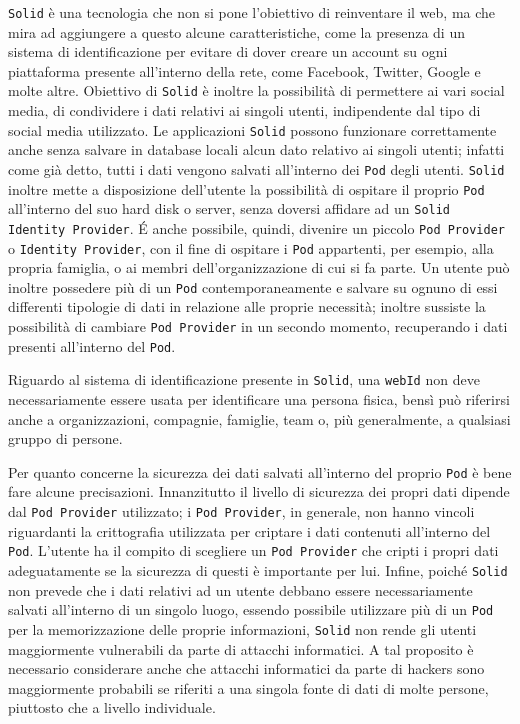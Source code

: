 {\tt Solid} è una tecnologia che non si pone l'obiettivo di reinventare il web, ma che mira ad aggiungere a questo alcune caratteristiche, come la presenza di un sistema di identificazione per evitare di dover creare un account su ogni piattaforma presente all'interno della rete, come Facebook, Twitter, Google e molte altre. Obiettivo di {\tt Solid} è inoltre la possibilità di permettere ai vari social media, di condividere i dati relativi ai singoli utenti, indipendente dal tipo di social media utilizzato. Le applicazioni {\tt Solid} possono funzionare correttamente anche senza salvare in database locali alcun dato relativo ai singoli utenti; infatti come già detto, tutti i dati vengono salvati all'interno dei {\tt Pod} degli utenti. {\tt Solid} inoltre mette a disposizione dell'utente la possibilità di ospitare il proprio {\tt Pod} all'interno del suo hard disk o server, senza doversi affidare ad un {\tt Solid Identity Provider}. É anche possibile, quindi, divenire un piccolo {\tt Pod Provider} o {\tt Identity Provider}, con il fine di ospitare i {\tt Pod} appartenti, per esempio, alla propria famiglia, o ai membri dell'organizzazione di cui si fa parte. Un utente può inoltre possedere più di un {\tt Pod} contemporaneamente e salvare su ognuno di essi differenti tipologie di dati in relazione alle proprie necessità; inoltre sussiste la possibilità di cambiare {\tt Pod Provider} in un secondo momento, recuperando i dati presenti all'interno del {\tt Pod}.

\bigskip
\medskip

Riguardo al sistema di identificazione presente in {\tt Solid}, una {\tt webId} non deve\\ necessariamente essere usata per identificare una persona fisica, bensì può riferirsi anche a organizzazioni, compagnie, famiglie, team o, più generalmente, a qualsiasi gruppo di persone.

\bigskip
\medskip

Per quanto concerne la sicurezza dei dati salvati all'interno del proprio {\tt Pod} è bene fare alcune precisazioni. Innanzitutto il livello di sicurezza dei propri dati dipende dal {\tt Pod Provider} utilizzato; i {\tt Pod Provider}, in generale, non hanno vincoli riguardanti la crittografia utilizzata per criptare i dati contenuti all'interno del {\tt Pod}. L'utente ha il compito di scegliere un {\tt Pod Provider} che cripti i propri dati adeguatamente se la sicurezza di questi è importante per lui. Infine, poiché {\tt Solid} non prevede che i dati relativi ad un utente debbano essere necessariamente salvati all'interno di un singolo luogo, essendo possibile utilizzare più di un {\tt Pod} per la memorizzazione delle proprie informazioni, {\tt Solid} non rende gli utenti maggiormente vulnerabili da parte di attacchi informatici. A tal proposito è necessario considerare anche che attacchi informatici da parte di hackers sono maggiormente probabili se riferiti a una singola fonte di dati di molte persone, piuttosto che a livello individuale.



